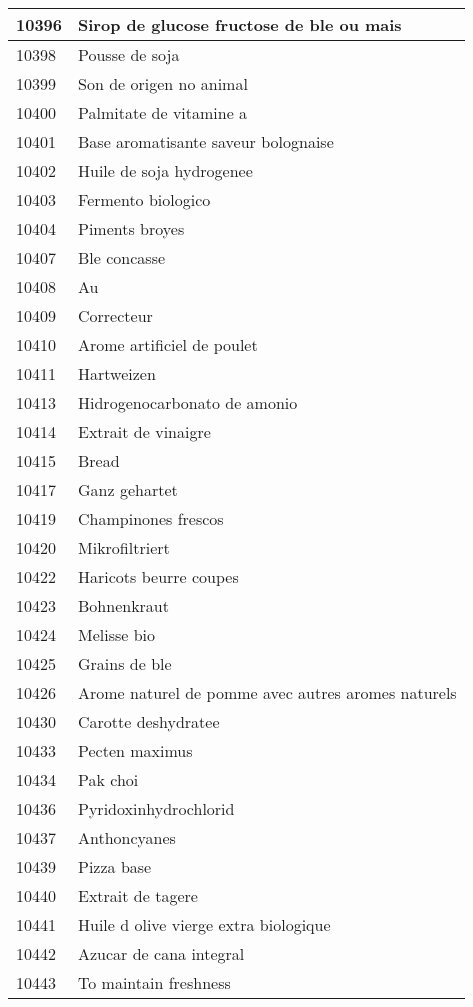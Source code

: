 \begin{longtable}{|l|l|}
10396 & Sirop de glucose fructose de ble ou mais \\ \hline 
10398 & Pousse de soja \\ \hline 
10399 & Son de origen no animal \\ \hline 
10400 & Palmitate de vitamine a \\ \hline 
10401 & Base aromatisante saveur bolognaise \\ \hline 
10402 & Huile de soja hydrogenee \\ \hline 
10403 & Fermento biologico \\ \hline 
10404 & Piments broyes \\ \hline 
10407 & Ble concasse \\ \hline 
10408 & Au \\ \hline 
10409 & Correcteur \\ \hline 
10410 & Arome artificiel de poulet \\ \hline 
10411 & Hartweizen \\ \hline 
10413 & Hidrogenocarbonato de amonio \\ \hline 
10414 & Extrait de vinaigre \\ \hline 
10415 & Bread \\ \hline 
10417 & Ganz gehartet \\ \hline 
10419 & Champinones frescos \\ \hline 
10420 & Mikrofiltriert \\ \hline 
10422 & Haricots beurre coupes \\ \hline 
10423 & Bohnenkraut \\ \hline 
10424 & Melisse bio \\ \hline 
10425 & Grains de ble \\ \hline 
10426 & Arome naturel de pomme avec autres aromes naturels \\ \hline 
10430 & Carotte deshydratee \\ \hline 
10433 & Pecten maximus \\ \hline 
10434 & Pak choi \\ \hline 
10436 & Pyridoxinhydrochlorid \\ \hline 
10437 & Anthoncyanes \\ \hline 
10439 & Pizza base \\ \hline 
10440 & Extrait de tagere \\ \hline 
10441 & Huile d olive vierge extra biologique \\ \hline 
10442 & Azucar de cana integral \\ \hline 
10443 & To maintain freshness \\ \hline 

\end{longtable}
